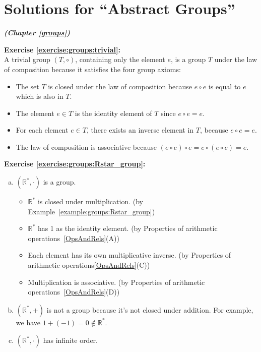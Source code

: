 
\section{Solutions for  ``Abstract Groups''}
\noindent\textbf{\textit{ (Chapter \ref{groups})}}\bigskip

\noindent\textbf{Exercise \ref{exercise:groups:trivial}:}
\\
A trivial group $(T, \circ )$, containing only the element $e$, is a group $T$ under the law of composition because it satisfies the four group axioms: 

\begin{itemize}
\item
The set $T$ is closed under the law of composition because $e \circ e $ is equal to $e$ which is also in $T$.

\item
The element $e \in T$ is the identity element of $T$ since $e \circ e = e$.

\item
For each element $e \in T$, there exists an inverse element in $T$, because $e \circ e = e$.

\item
The law of composition is associative because $(e \circ e) \circ e = e \circ (e \circ e) = e$.
\end{itemize}
\medskip

\noindent\textbf{Exercise \ref{exercise:groups:Rstar_group}:}
\begin{enumerate}[(a)]
\item
$({\mathbb R}^{\ast}, \cdot)$ is a group.
\begin{itemize}
	\item
	${\mathbb R}^{\ast}$ is closed under multiplication. (by Example~\ref{example:groups:Rstar_group}) 

	\item
	${\mathbb R}^{\ast}$ has 1 as the identity element. (by Properties of arithmetic operations~\ref{OpsAndRels}(A))

	\item
	Each element has its own multiplicative inverse. (by  Properties of arithmetic operations\ref{OpsAndRels}(C))

	\item
	Multiplication is associative. (by Properties of arithmetic operations~\ref{OpsAndRels}(D))
	\end{itemize}
	
\item
$({\mathbb R}^{\ast}, +)$ is not a group because it's not closed under addition. For example, we have $1 + (-1) = 0 \not\in {\mathbb R}^{\ast}$.

\item
$({\mathbb R}^{\ast}, \cdot)$ has infinite order.
\end{enumerate}

